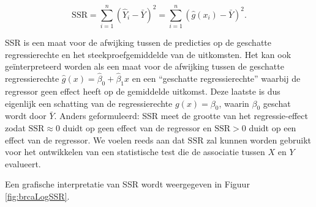 \documentclass[
  12pt,dutch,coursenotes]{book}
\theoremstyle{definition}
\theoremstyle{definition}
\theoremstyle{definition}
\theoremstyle{remark}
\begin{document}
\[\text{SSR} = \sum_{i=1}^n (\hat{Y}_i - \bar{Y})^2 = \sum_{i=1}^n (\hat{g}(x_i) - \bar{Y})^2.\]

SSR is een maat voor de afwijking tussen de predicties op de geschatte regressierechte en het steekproefgemiddelde van de uitkomsten.
Het kan ook geïnterpreteerd worden als een maat voor de afwijking tussen de geschatte regressierechte \(\hat{g}(x)=\hat\beta_0+\hat\beta_1x\) en een ``geschatte regressierechte'' waarbij de regressor geen effect heeft op de gemiddelde uitkomst.
Deze laatste is dus eigenlijk een schatting van de regressierechte \(g(x)=\beta_0\), waarin \(\beta_0\) geschat wordt door \(\bar{Y}\).
Anders geformuleerd: SSR meet de grootte van het regressie-effect zodat \(\text{SSR} \approx 0\) duidt op geen effect van de regressor en \(\text{SSR}>0\) duidt op een effect van de regressor. We voelen reeds aan dat \(\text{SSR}\) zal kunnen worden gebruikt voor het ontwikkelen van een statistische test die de associatie tussen \(X\) en \(Y\) evalueert.

Een grafische interpretatie van SSR wordt weergegeven in Figuur \ref{fig:brcaLogSSR}.
\end{document}
